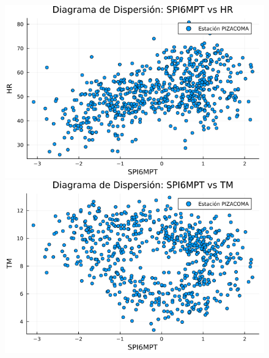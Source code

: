 \begin{figure}[htbp]
\begin{minipage}{0.32\textwidth}
\end{minipage}

\vspace{0.5cm}  %

\begin{minipage}{0.32\textwidth}
    \centering
    \includegraphics[width=\linewidth]{Capitulos/Scaterplot/PIZACOMA_SPI6MPT_vs_HR.png}
\end{minipage}\hfill
\begin{minipage}{0.32\textwidth}
    \centering
    \includegraphics[width=\linewidth]{Capitulos/Scaterplot/PIZACOMA_SPI6MPT_vs_TM.png}
\end{minipage}\hfill
\begin{minipage}{0.32\textwidth}
    \centering

\end{minipage}
\end{figure}
